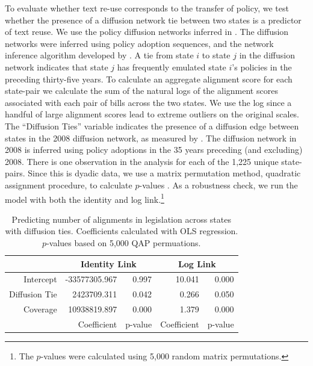 \documentclass[12pt]{article} %
\begin{document}
To evaluate whether text re-use corresponds to the transfer of policy, we test whether the presence of a diffusion network tie between two states is a predictor of text reuse. We use the policy diffusion networks inferred in \citet{desmarais2015}. The diffusion networks were inferred using policy adoption sequences, and the network inference algorithm developed by \citet{gomez2010inferring}. A tie from state $i$ to state $j$ in the diffusion network indicates that state $j$ has frequently emulated state $i$'s policies in the preceding thirty-five years. To calculate an aggregate alignment score for each state-pair we calculate the sum of the natural logs of the alignment scores associated with each pair of bills across the two states. We use the log since a handful of large alignment scores lead to extreme outliers on the original scales. The ``Diffusion Ties'' variable indicates the presence of a diffusion edge between states in the 2008 diffusion network, as measured by \citet{desmarais2015}. The diffusion network in 2008 is inferred using policy adoptions in the 35 years preceding (and excluding) 2008.  There is one observation in the analysis for each of the 1,225 unique state-pairs. Since this is dyadic data, we use a matrix permutation method, quadratic assignment procedure, to calculate $p$-values \citep{krackhardt1988}. As a robustness check, we run the model with both the identity and log link.\footnote{The $p$-values were calculated using 5,000 random matrix permutations.}

\begin{table}[ht]
\centering
\begin{tabular}{rrrrr}
\hline
& \multicolumn{2}{c}{Identity Link} & \multicolumn{2}{c}{Log Link} \\
  \hline
Intercept & -33577305.967 & 0.997 & 10.041 & 0.000 \\ 
  Diffusion Tie & 2423709.311 & 0.042 & 0.266 & 0.050 \\ 
    Coverage & 10938819.897 & 0.000 & 1.379 & 0.000 \\ 
 & Coefficient & p-value & Coefficient & p-value \\ 
\end{tabular}
\caption{Predicting number of alignments in legislation across states with diffusion ties. Coefficients calculated with OLS regression. $p$-values based on 5,000 QAP permuations.}
\label{tab:qap.diffusion}
\end{table}
\end{document}
